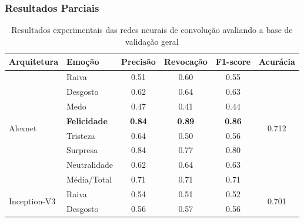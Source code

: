 \documentclass{beamer}
\begin{document}
\begin{frame}
 \frametitle{Resultados Parciais}
\begin{table}[]
\tiny
\centering
\caption{Resultados experimentais das redes neurais de convolução avaliando a base de validação geral}
\label{table:resultsexp}
\begin{tabular}{llcccc}
\hline
\textbf{Arquitetura}                & \textbf{Emoção}       & \textbf{Precisão} & \textbf{Revocação} & \textbf{F1-score} & \textbf{Acurácia}               \\ \hline
\multirow{8}{*}{Alexnet}            & Raiva                 & 0.51              & 0.60               & 0.55              & \multirow{8}{*}{0.712}          \\
                                    & Desgosto              & 0.62              & 0.64               & 0.63              &                                 \\
                                    & Medo                  & 0.47              & 0.41               & 0.44              &                                 \\
                                    & \scriptsize \textbf{Felicidade}            & \scriptsize \textbf{0.84}              & \scriptsize \textbf{0.89}               & \scriptsize \textbf{0.86}              &                                 \\
                                    & Tristeza              & 0.64              & 0.50               & 0.56              &                                 \\
                                    & Surpresa              & 0.84              & 0.77               & 0.80              &                                 \\
                                    & Neutralidade          & 0.62              & 0.64               & 0.63              &                                 \\
                                    & Média/Total           & 0.71              & 0.71               & 0.71              &                                 \\ \hline
\multirow{8}{*}{Inception-V3}       & Raiva                 & 0.54              & 0.51               & 0.52              & \multirow{8}{*}{0.701}          \\
                                    & Desgosto              & 0.56              & 0.57               & 0.56              &                                 \\

\end{tabular}
\end{table}
\end{frame}
\end{document}
